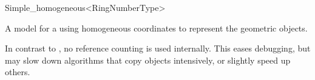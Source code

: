 \begin{ccRefClass}{Simple_homogeneous<RingNumberType>}

\ccDefinition
A model for a  using homogeneous coordinates to represent the
geometric objects. 

\ccIsModel
{}

\ccTypes
{}
\ccGlue
{}

\ccImplementation In contrast to , no reference counting
is used internally. This eases debugging, but may slow down algorithms
that copy objects intensively, or slightly speed up others.

\ccSeeAlso
{} \\
 \\
 \\
\end{ccRefClass}
